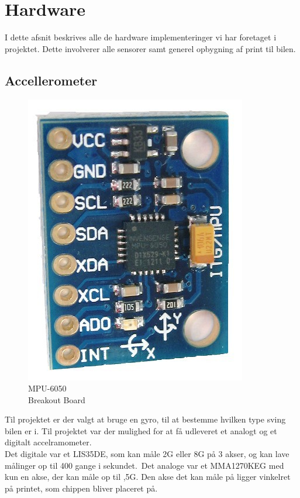 \section{Hardware}
I dette afsnit beskrives alle de hardware implementeringer vi har foretaget i projektet. Dette involverer alle sensorer samt generel opbygning af print til bilen.

\subsection{Accellerometer}

\begin{figure}
	\begin{minipage}{.3\textwidth}\centering
		\includegraphics[scale=0.2]{Billeder/mpu-6050.jpg}
		\caption{MPU-6050\\Breakout Board}
		\label{fig:MPU-6050-Breakout}
	\end{minipage}
\end{figure}

Til projektet er der valgt at bruge en gyro, til at bestemme hvilken type sving bilen er i. Til projektet var der mulighed for at få udleveret et analogt og et digitalt accelramometer.
\\Det digitale var et LIS35DE, som kan måle \textpm 2G eller \textpm 8G på 3 akser, og kan lave målinger op til 400 gange i sekundet.\ Det analoge var et MMA1270KEG med kun en akse, der kan måle op til ,5G. Den akse det kan måle på ligger vinkelret på printet, som chippen bliver placeret på.
\linebreak

